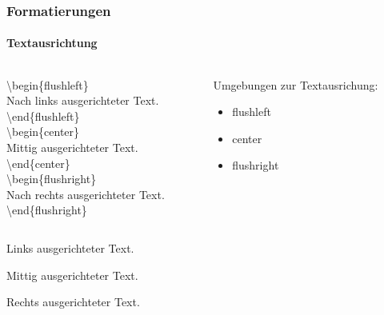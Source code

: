 \begin{frame}
\frametitle{Formatierungen}
\framesubtitle{Textausrichtung}
\begin{columns}
\begin{column}{0.5\textwidth}
\begin{ttfamily}\footnotesize
\color{unibablueI}\textbackslash \color{unibablueI}begin\color{black}\{flushleft\}\\
Nach links ausgerichteter Text.\\
\color{unibablueI}\textbackslash \color{unibablueI}end\color{black}\{flushleft\}\\
\vspace{2mm}
\color{unibablueI}\textbackslash \color{unibablueI}begin\color{black}\{center\}\\
Mittig ausgerichteter Text.\\
\color{unibablueI}\textbackslash \color{unibablueI}end\color{black}\{center\}\\
\vspace{2mm}
\color{unibablueI}\textbackslash \color{unibablueI}begin\color{black}\{flushright\}\\
Nach rechts ausgerichteter Text.\\
\color{unibablueI}\textbackslash \color{unibablueI}end\color{black}\{flushright\}\\
\end{ttfamily}
\end{column}
\begin{column}{0.5\textwidth}
Umgebungen zur Textausrichung:\\
\begin{itemize}
\item flushleft	
\item center
\item flushright
\end{itemize}
\end{column}
\end{columns}
\begin{flushleft}
Links ausgerichteter Text.\\
\end{flushleft}
\begin{center}
Mittig ausgerichteter Text.\\
\end{center}
\begin{flushright}
Rechts ausgerichteter Text.\\
\end{flushright}
\end{frame}
